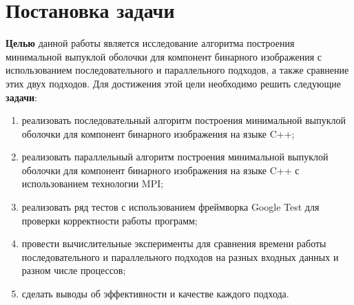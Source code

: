 \section{Постановка задачи}
\textbf{Целью} данной работы является исследование алгоритма построения минимальной выпуклой оболочки для компонент бинарного изображения с использованием последовательного и параллельного подходов, а также сравнение этих двух подходов. Для достижения этой цели необходимо решить следующие \textbf{задачи}:
\begin{enumerate}
	\item реализовать последовательный алгоритм построения минимальной выпуклой оболочки для компонент бинарного изображения на языке C++;
	\item реализовать параллельный алгоритм построения минимальной выпуклой оболочки для компонент бинарного изображения на языке C++ с использованием технологии MPI;
	\item реализовать ряд тестов с использованием фреймворка Google Test для проверки корректности работы программ;
	\item провести вычислительные эксперименты для сравнения времени работы последовательного и параллельного подходов на разных входных данных и разном числе процессов;
	\item сделать выводы об эффективности и качестве каждого подхода.
\end{enumerate}
